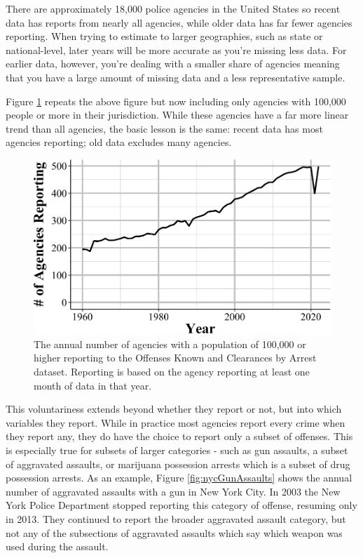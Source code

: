\documentclass[
  12pt,
  openany]{book}
\begin{document}
There are approximately 18,000 police agencies in the United States so recent data has reports from nearly all agencies, while older data has far fewer agencies reporting. When trying to estimate to larger geographies, such as state or national-level, later years will be more accurate as you're missing less data. For earlier data, however, you're dealing with a smaller share of agencies meaning that you have a large amount of missing data and a less representative sample.

Figure \ref{fig:bigAgenciesReporting} repeats the above figure but now including only agencies with 100,000 people or more in their jurisdiction. While these agencies have a far more linear trend than all agencies, the basic lesson is the same: recent data has most agencies reporting; old data excludes many agencies.

\begin{figure}

{\centering \includegraphics[width=0.9\linewidth]{index_files/figure-latex/bigAgenciesReporting-1} 

}

\caption{The annual number of agencies with a population of 100,000 or higher reporting to the Offenses Known and Clearances by Arrest dataset. Reporting is based on the agency reporting at least one month of data in that year.}\label{fig:bigAgenciesReporting}
\end{figure}

This voluntariness extends beyond whether they report or not, but into which variables they report. While in practice most agencies report every crime when they report any, they do have the choice to report only a subset of offenses. This is especially true for subsets of larger categories - such as gun assaults, a subset of aggravated assaults, or marijuana possession arrests which is a subset of drug possession arrests. As an example, Figure \ref{fig:nycGunAssaults} shows the annual number of aggravated assaults with a gun in New York City. In 2003 the New York Police Department stopped reporting this category of offense, resuming only in 2013. They continued to report the broader aggravated assault category, but not any of the subsections of aggravated assaults which say which weapon was used during the assault.
\end{document}
